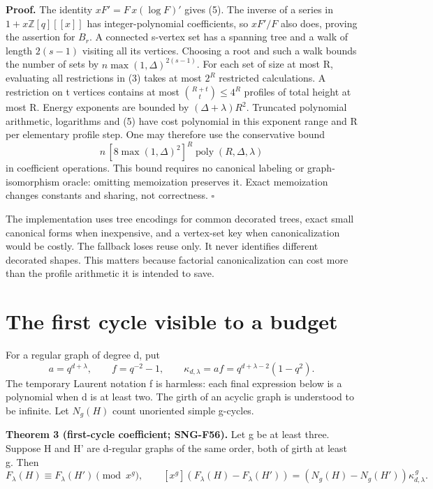 \documentclass[
  11pt,
  a4paper,
]{article}
\begin{document}
\textbf{Proof.} The identity \(xF'=F\,x(\log F)'\) gives (5). The
inverse of a series in \(1+x\mathbb Z[q][[x]]\) has integer-polynomial
coefficients, so \(xF'/F\) also does, proving the assertion for \(B_r\).
A connected s-vertex set has a spanning tree and a walk of length
\(2(s-1)\) visiting all its vertices. Choosing a root and such a walk
bounds the number of sets by \(n\max(1,\Delta)^{2(s-1)}\). For each set
of size at most R, evaluating all restrictions in (3) takes at most
\(2^R\) restricted calculations. A restriction on t vertices contains at
most \(\binom{R+t}{t}\le4^R\) profiles of total height at most R. Energy
exponents are bounded by \((\Delta+\lambda)R^2\). Truncated polynomial
arithmetic, logarithms and (5) have cost polynomial in this exponent
range and R per elementary profile step. One may therefore use the
conservative bound \[
n\,[8\max(1,\Delta)^2]^R\operatorname{poly}(R,\Delta,\lambda)
\tag{6}
\] in coefficient operations. This bound requires no canonical labeling
or graph-isomorphism oracle: omitting memoization preserves it. Exact
memoization changes constants and sharing, not correctness. \(\square\)

The implementation uses tree encodings for common decorated trees, exact
small canonical forms when inexpensive, and a vertex-set key when
canonicalization would be costly. The fallback loses reuse only. It
never identifies different decorated shapes. This matters because
factorial canonicalization can cost more than the profile arithmetic it
is intended to save.

\hypertarget{the-first-cycle-visible-to-a-budget}{%
\section{The first cycle visible to a
budget}\label{the-first-cycle-visible-to-a-budget}}

For a regular graph of degree d, put \[
a=q^{d+\lambda},\qquad f=q^{-2}-1,
\qquad \kappa_{d,\lambda}=af
=q^{d+\lambda-2}(1-q^2).
\tag{7}
\] The temporary Laurent notation f is harmless: each final expression
below is a polynomial when d is at least two. The girth of an acyclic
graph is understood to be infinite. Let \(N_g(H)\) count unoriented
simple g-cycles.

\textbf{Theorem 3 (first-cycle coefficient; SNG-F56).} Let g be at least
three. Suppose H and H' are d-regular graphs of the same order, both of
girth at least g. Then \[
F_\lambda(H)\equiv F_\lambda(H')\pmod{x^g},
\qquad
[x^g](F_\lambda(H)-F_\lambda(H'))
=(N_g(H)-N_g(H'))\kappa_{d,\lambda}^{\,g}.
\tag{8}
\]
\end{document}
